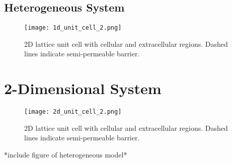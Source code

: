 \subsection{Heterogeneous System}


\begin{figure}[h]
	\centering
	\texttt{[image: 1d\_unit\_cell\_2.png]}
	\caption{2D lattice unit cell with cellular and extracellular regions. Dashed lines indicate semi-permeable barrier.}
	\label{fig:1d_unit_cell_2.png}
\end{figure}

\section{2-Dimensional System}

\begin{figure}[h]
	\centering
	\texttt{[image: 2d\_unit\_cell\_2.png]}
	\caption{2D lattice unit cell with cellular and extracellular regions. Dashed lines indicate semi-permeable barrier.}
	\label{fig:2d_unit_cell_2.png}
\end{figure}
*include figure of heterogeneous model*